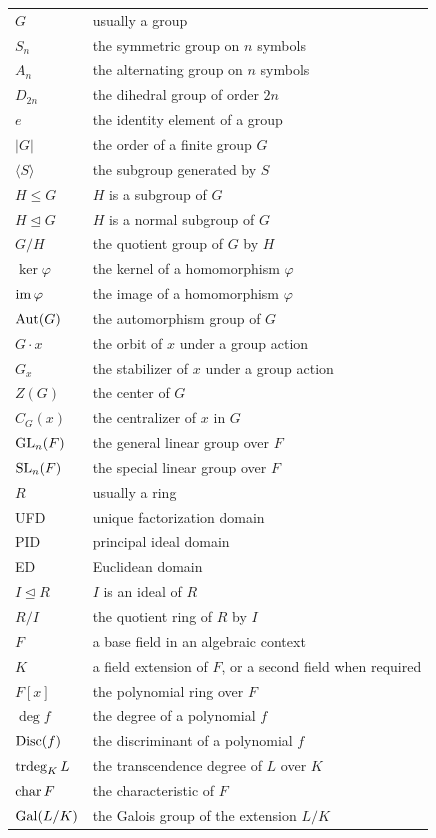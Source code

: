 {\begin{longtable}{@{}L{0.27\textwidth}L{0.65\textwidth}@{}}
        $G$ & usually a group \\
        $S_n$ & the symmetric group on $n$ symbols \\
        $A_n$ & the alternating group on $n$ symbols \\
        $D_{2n}$ & the dihedral group of order $2n$ \\
        $e$ & the identity element of a group \\
        $|G|$ & the order of a finite group $G$ \\
        $\langle S\rangle$ & the subgroup generated by $S$ \\
        $H\leq G$ & $H$ is a subgroup of $G$ \\
        $H\trianglelefteq G$ & $H$ is a normal subgroup of $G$ \\
        $G/H$ & the quotient group of $G$ by $H$ \\
        $\ker\varphi$ & the kernel of a homomorphism $\varphi$ \\
        $\operatorname{im}\varphi$ & the image of a homomorphism $\varphi$ \\
        $\operatorname{Aut}(G)$ & the automorphism group of $G$ \\
        $G\cdot x$ & the orbit of $x$ under a group action \\
        $G_x$ & the stabilizer of $x$ under a group action \\
        $Z(G)$ & the center of $G$ \\
        $C_G(x)$ & the centralizer of $x$ in $G$ \\
        $\operatorname{GL}_n(F)$ & the general linear group over $F$ \\
        $\operatorname{SL}_n(F)$ & the special linear group over $F$ \\
        $R$ & usually a ring \\
        UFD & unique factorization domain \\
        PID & principal ideal domain \\
        ED & Euclidean domain \\
        $I\trianglelefteq R$ & $I$ is an ideal of $R$ \\
        $R/I$ & the quotient ring of $R$ by $I$ \\
        $F$ & a base field in an algebraic context \\
        $K$ & a field extension of $F$, or a second field when required \\
        $F[x]$ & the polynomial ring over $F$ \\
        $\deg f$ & the degree of a polynomial $f$ \\
        $\operatorname{Disc}(f)$ & the discriminant of a polynomial $f$ \\
        $\operatorname{trdeg}_K L$ & the transcendence degree of $L$ over $K$ \\
        $\operatorname{char} F$ & the characteristic of $F$ \\
        $\operatorname{Gal}(L/K)$ & the Galois group of the extension $L/K$ \\
    \end{longtable}
    }

